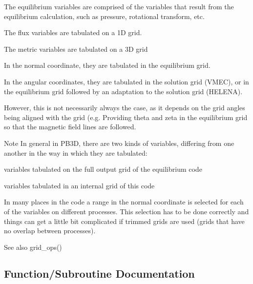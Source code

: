 \begin{DoxyItemize}
\item The equilibrium variables are comprised of the variables that result from the equilibrium calculation, such as pressure, rotational transform, etc.
\item The flux variables are tabulated on a 1D grid.
\item The metric variables are tabulated on a 3D grid
\begin{DoxyItemize}
\item In the normal coordinate, they are tabulated in the equilibrium grid.
\item In the angular coordinates, they are tabulated in the solution grid (V\+M\+EC), or in the equilibrium grid followed by an adaptation to the solution grid (H\+E\+L\+E\+NA).
\end{DoxyItemize}
\item However, this is not necessarily always the case, as it depends on the grid angles being aligned with the grid (e.\+g. Providing theta and zeta in the equilibrium grid so that the magnetic field lines are followed.
\end{DoxyItemize}

\begin{DoxyNote}{Note}
In general in P\+B3D, there are two kinds of variables, differing from one another in the way in which they are tabulated\+:
\begin{DoxyItemize}
\item variables tabulated on the full output grid of the equilibrium code
\item variables tabulated in an internal grid of this code 
\end{DoxyItemize}

In many places in the code a range in the normal coordinate is selected for each of the variables on different processes. This selection has to be done correctly and things can get a little bit complicated if trimmed grids are used (grids that have no overlap between processes).
\end{DoxyNote}
\begin{DoxySeeAlso}{See also}
grid\+\_\+ops() 
\end{DoxySeeAlso}


\subsection{Function/\+Subroutine Documentation}
\mbox{\label{namespaceeq__vars_aa781ffa18b6b17905e126871c43d3267}} 

